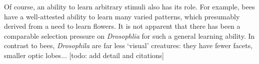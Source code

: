 Of course, an ability to learn arbitrary stimuli also has its role.
For example, bees have a well-attested ability to learn many varied patterns, which presumably derived from a need to learn flowers.
It is not apparent that there has been a comparable selection pressure on \emph{Drosophlia} for such a general learning ability.
In contrast to bees, \emph{Drosophila} are far less `visual' creatures: they have fewer facets, smaller optic lobes... [todo: add detail and citations]

\begin{comment}
[There is also the question of whether learning to discriminate arbitrary visual patterns is an ecologically relevant task for flies.
Certainly a general ability to perform associative learning is useful, but for many tasks, such as discriminating a conspecific from a predator, parsimonious, task-specific strategies are sufficient \cite{Layne1997}.
[Differences in fly vs bee neuroanatomy and eyes?]
This is in contrast to bees, which have a well-attested ability to discriminate visual stimuli and need to be able to discriminate arbitrary patterns in order to distinguish flowers.
Their anatomy too seems more suited to this task: they have many more facets [true?] and much larger optic lobes [this is probably true]. [...]
Just because an organism is able to perform a task does not mean that the organism has a `module' for this task.
For example, human beings are able to read despite there not having been selection pressure for this ability.
Like reading, it might also be a by-product of other evolved systems.
What is more interesting is how this information could be used by the organism in the service of behaviour; for example, these ring neuron visual filters can be used by an agent to localise within an arena \cite{Dewar2015}, mimicking real fly behaviour \cite{Ofstad2011}.]

\begin{comment}
More generally, it may be that \emph{Drosophila} are not specialised for discriminating arbitrary visual stimuli.
Although flies evidently have some capacity for discriminating patterns, it is not obvious that this is based on modules for extracting specific shape parameters.
In contrast to bees, which have to learn to distinguish flowers, there would seem to be no comparable selection pressure on flies, suggesting that performance may involve coopting other systems [?].
Indeed, many ecologically relevant discrimination tasks can be performed with parsimonious heuristics, rather than elaborate visual processing \cite{Layne1997}.


\end{comment}
